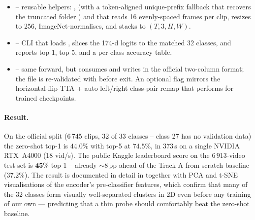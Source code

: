 \begin{itemize}[leftmargin=2em]
\item {} -- reusable helpers:
   ,  (with a
   token-aligned unique-prefix fallback that recovers the truncated
   folder )
   and  that reads 16 evenly-spaced frames per
   clip, resizes to 256, ImageNet-normalises, and stacks to \((T,3,H,W)\).
\item {} -- CLI that loads
   , slices the 174-d logits to the
   matched 32 classes, and reports top-1, top-5, and a per-class
   accuracy table.
\item {} -- same
   forward, but consumes  and writes
   in the official two-column format; the file is re-validated with
    before exit. An optional
    flag mirrors the horizontal-flip TTA + auto
   left/right class-pair remap that  performs
   for trained checkpoints.
\end{itemize}

\paragraph{Result.} On the official  split (6\,745
clips, 32 of 33 classes -- class 27 has no validation data) the
zero-shot top-1 is \(\mathbf{44.0\%}\) with top-5 at
\(\mathbf{74.5\%}\), in 373\,s on a single NVIDIA RTX~A4000
(18 vid/s). The public Kaggle leaderboard score on the
\(6\,913\)-video test set is \(\mathbf{45\%}\) top-1 -- already
\(\sim 8\)\,pp ahead of the Track-A from-scratch baseline (37.2\%).
The result is documented in detail in 
together with PCA and t-SNE visualisations of the encoder's
pre-classifier features, which confirm that many of the 32 classes form
visually well-separated clusters in 2D even before any training of our
own --- predicting that a thin probe should comfortably beat the
zero-shot baseline.


